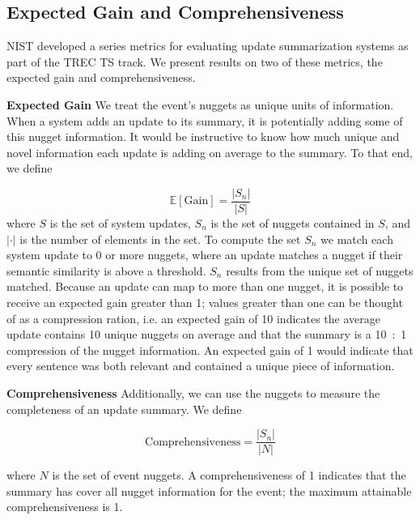 \subsection{Expected Gain and Comprehensiveness}

NIST developed a series metrics for evaluating update summarization systems
as part of the TREC TS track.
We present results on two of these metrics, the expected gain and 
comprehensiveness.

\textbf{Expected Gain } We treat the event's nuggets as unique units of 
information.
When a system adds an update to its summary, it is potentially adding some
of this nugget information. It would be instructive to know how much unique
and novel information each update is adding on average to the summary.
To that end, we define

\[ \mathrm{\mathbb{E}[Gain]} = \frac{|S_n|}{|S|}%
\] 
where $S$ is the set of system updates, 
$S_n$ is the set of nuggets contained in $S$, and $|\cdot|$ is the number of
elements in the set.
To compute the set $S_n$ we match each system update to 0 or more nuggets, 
where an update matches a nugget if their semantic similarity is above 
a threshold. $S_n$ results from the unique set of nuggets matched.
Because an update can map to more than one nugget, it is possible to receive an
expected gain greater than 1; values greater than one can be thought of as a 
compression ration, i.e. an expected gain of 10 indicates the average update
contains 10 unique nuggets on average and that the summary is a 10~:~1 
compression of the nugget information.
An expected gain of 1 would indicate that every
sentence was both relevant and contained a unique piece of information.



\textbf{Comprehensiveness } Additionally, we can use the nuggets to measure the completeness of an update 
summary. We define

\[ \mathrm{Comprehensiveness} = \frac{|S_n|}{|N|}\]

where $N$ is the set of event nuggets.
A comprehensiveness of 1 indicates that the summary has cover 
all nugget information for the event; the maximum
attainable comprehensiveness is 1.

